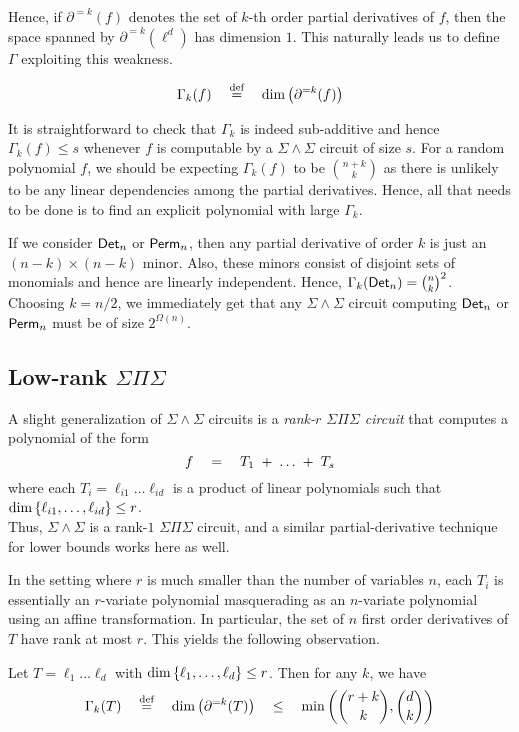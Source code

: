 Hence, if $\partial^{=k}(f)$ denotes the set of $k$-th order partial derivatives of $f$, then the space spanned by $\partial^{=k}(\ell^d)$ has dimension $1$. 
This naturally leads us to define $\Gamma$ exploiting this weakness. 

$$
\Gamma_k(f)\quad \stackrel{\text{def}}{=} \quad \dim \left(\partial^{=k}(f)\right)
$$

It is straightforward to check that $\Gamma_k$ is indeed sub-additive and hence $\Gamma_k(f) \leq s$ whenever $f$ is computable by a $\Sigma\!\wedge\!\Sigma$ circuit of size $s$. 
For a random polynomial $f$, we should be expecting $\Gamma_k(f)$ to be $\binom{n+k}{k}$ as there is unlikely to be any linear dependencies among the partial derivatives. 
Hence, all that needs to be done is to find an explicit polynomial with large $\Gamma_k$. 


If we consider $\operatorname{\mathsf{Det}}_n$ or $\operatorname{\mathsf{Perm}}_n$, then any partial derivative of order $k$ is just an $(n-k)\times(n-k)$ minor. 
Also, these minors consist of disjoint sets of monomials and hence are linearly independent. 
Hence, $\Gamma_k(\operatorname{\mathsf{Det}}_n) = \binom{n}{k}^2$. 
Choosing $k = n/2$, we immediately get that any $\Sigma\!\wedge\!\Sigma$ circuit computing $\operatorname{\mathsf{Det}}_n$ or $\operatorname{\mathsf{Perm}}_n$ must be of size $2^{\Omega(n)}$. \\

\subsection{Low-rank $\Sigma\Pi\Sigma$}\label{sec:low-rank-sps}

A slight generalization of $\Sigma\!\wedge\!\Sigma$ circuits is a \emph{rank-$r$ $\Sigma\Pi\Sigma$ circuit} that computes a polynomial of the form 
$$
f \quad = \quad  T_1 \;+\; \dots \;+\; T_s
$$
where each $T_i = \ell_{i1}\dots \ell_{id}$ is a product of linear polynomials such that $\dim\left\{\ell_{i1},\dots, \ell_{id}\right\}\leq r$. \\

Thus, $\Sigma\!\wedge\!\Sigma$  is a rank-$1$ $\Sigma\Pi\Sigma$ circuit, and a similar partial-derivative technique for lower bounds works here as well. 

In the setting where $r$ is much smaller than the number of variables $n$, each $T_i$ is essentially an $r$-variate polynomial masquerading as an $n$-variate polynomial using an affine transformation. 
In particular, the set of $n$ first order derivatives of $T$ have rank at most $r$. 
This yields the following observation.

\begin{observation}
Let $T = \ell_1\dots \ell_d$ with $\dim\left\{\ell_1,\dots, \ell_d\right\}\leq r$. 
Then for any $k$, we have
$$
\Gamma_k(T) \quad \stackrel{\text{def}}{=} \quad\dim\left(\partial^{=k}(T)\right) \quad \leq \quad \min\left(\binom{r+k}{k}, \binom{d}{k}\right)
$$
\end{observation}

